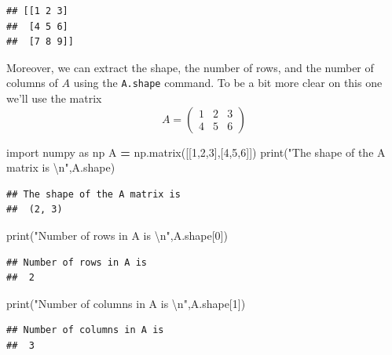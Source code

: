 \documentclass[
]{book}
\newenvironment{Shaded}{\begin{snugshade}}{\end{snugshade}}
\newcommand{\BuiltInTok}[1]{#1}
\newcommand{\CharTok}[1]{\textcolor[rgb]{0.31,0.60,0.02}{#1}}
\newcommand{\DecValTok}[1]{\textcolor[rgb]{0.00,0.00,0.81}{#1}}
\newcommand{\ImportTok}[1]{#1}
\newcommand{\NormalTok}[1]{#1}
\newcommand{\OperatorTok}[1]{\textcolor[rgb]{0.81,0.36,0.00}{\textbf{#1}}}
\newcommand{\StringTok}[1]{\textcolor[rgb]{0.31,0.60,0.02}{#1}}
\theoremstyle{definition}
\theoremstyle{definition}
\theoremstyle{definition}
\theoremstyle{remark}
\begin{document}
\begin{verbatim}
## [[1 2 3]
##  [4 5 6]
##  [7 8 9]]
\end{verbatim}

Moreover, we can extract the shape, the number of rows, and the number of columns of \(A\) using the \texttt{A.shape} command. To be a bit more clear on this one we'll use the matrix
\[ A = \begin{pmatrix} 1 & 2 & 3 \\ 4 & 5 & 6 \end{pmatrix} \]

\begin{Shaded}
\begin{Highlighting}[]
\ImportTok{import}\NormalTok{ numpy }\ImportTok{as}\NormalTok{ np}
\NormalTok{A }\OperatorTok{=}\NormalTok{ np.matrix([[}\DecValTok{1}\NormalTok{,}\DecValTok{2}\NormalTok{,}\DecValTok{3}\NormalTok{],[}\DecValTok{4}\NormalTok{,}\DecValTok{5}\NormalTok{,}\DecValTok{6}\NormalTok{]])}
\BuiltInTok{print}\NormalTok{(}\StringTok{"The shape of the A matrix is }\CharTok{\textbackslash{}n}\StringTok{"}\NormalTok{,A.shape)}
\end{Highlighting}
\end{Shaded}

\begin{verbatim}
## The shape of the A matrix is 
##  (2, 3)
\end{verbatim}

\begin{Shaded}
\begin{Highlighting}[]
\BuiltInTok{print}\NormalTok{(}\StringTok{"Number of rows in A is }\CharTok{\textbackslash{}n}\StringTok{"}\NormalTok{,A.shape[}\DecValTok{0}\NormalTok{])}
\end{Highlighting}
\end{Shaded}

\begin{verbatim}
## Number of rows in A is 
##  2
\end{verbatim}

\begin{Shaded}
\begin{Highlighting}[]
\BuiltInTok{print}\NormalTok{(}\StringTok{"Number of columns in A is }\CharTok{\textbackslash{}n}\StringTok{"}\NormalTok{,A.shape[}\DecValTok{1}\NormalTok{])}
\end{Highlighting}
\end{Shaded}

\begin{verbatim}
## Number of columns in A is 
##  3
\end{verbatim}
\end{document}
